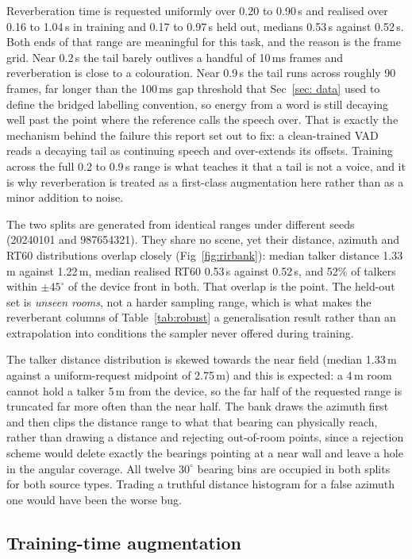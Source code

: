 \documentclass{article}
\begin{document}
Reverberation time is requested uniformly over 0.20 to 0.90\,s and realised over 0.16 to 1.04\,s in training and 0.17 to 0.97\,s held out, medians 0.53\,s against 0.52\,s. Both ends of that range are meaningful for this task, and the reason is the frame grid. Near 0.2\,s the tail barely outlives a handful of 10\,ms frames and reverberation is close to a colouration. Near 0.9\,s the tail runs across roughly 90 frames, far longer than the 100\,ms gap threshold that Sec~\ref{sec: data} used to define the bridged labelling convention, so energy from a word is still decaying well past the point where the reference calls the speech over. That is exactly the mechanism behind the failure this report set out to fix: a clean-trained VAD reads a decaying tail as continuing speech and over-extends its offsets. Training across the full 0.2 to 0.9\,s range is what teaches it that a tail is not a voice, and it is why reverberation is treated as a first-class augmentation here rather than as a minor addition to noise.

The two splits are generated from identical ranges under different seeds (20240101 and 987654321). They share no scene, yet their distance, azimuth and RT60 distributions overlap closely (Fig~\ref{fig:rirbank}): median talker distance 1.33\,m against 1.22\,m, median realised RT60 0.53\,s against 0.52\,s, and 52\% of talkers within $\pm 45^\circ$ of the device front in both. That overlap is the point. The held-out set is \emph{unseen rooms}, not a harder sampling range, which is what makes the reverberant columns of Table~\ref{tab:robust} a generalisation result rather than an extrapolation into conditions the sampler never offered during training.

The talker distance distribution is skewed towards the near field (median 1.33\,m against a uniform-request midpoint of 2.75\,m) and this is expected: a 4\,m room cannot hold a talker 5\,m from the device, so the far half of the requested range is truncated far more often than the near half. The bank draws the azimuth first and then clips the distance range to what that bearing can physically reach, rather than drawing a distance and rejecting out-of-room points, since a rejection scheme would delete exactly the bearings pointing at a near wall and leave a hole in the angular coverage. All twelve $30^\circ$ bearing bins are occupied in both splits for both source types. Trading a truthful distance histogram for a false azimuth one would have been the worse bug.

\subsection{Training-time augmentation}
\label{sec:aug:train}
\end{document}

